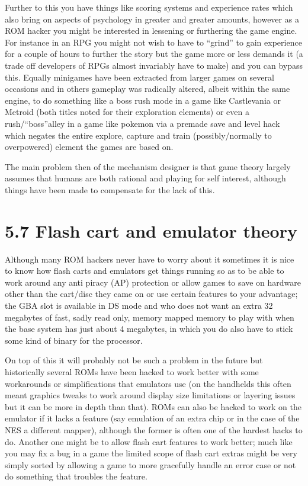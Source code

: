 \documentclass[
]{book}
\begin{document}
Further to this you have things like scoring systems and experience rates which also bring on aspects of psychology in greater and greater amounts, however as a ROM hacker you might be interested in lessening or furthering the game engine. For instance in an RPG you might not wish to have to ``grind'' to gain experience for a couple of hours to further the story but the game more or less demands it (a trade off developers of RPGs almost invariably have to make) and you can bypass this. Equally minigames have been extracted from larger games on several occasions and in others gameplay was radically altered, albeit within the same engine, to do something like a boss rush mode in a game like Castlevania or Metroid (both titles noted for their exploration elements) or even a rush/``boss''alley in a game like pokemon via a premade save and level hack which negates the entire explore, capture and train (possibly/normally to overpowered) element the games are based on.

The main problem then of the mechanism designer is that game theory largely assumes that humans are both rational and playing for self interest, although things have been made to compensate for the lack of this.

\hypertarget{flash-cart-and-emulator-theory}{%
\section{5.7 Flash cart and emulator theory}\label{flash-cart-and-emulator-theory}}

Although many ROM hackers never have to worry about it sometimes it is nice to know how flash carts and emulators get things running so as to be able to work around any anti piracy (AP) protection or allow games to save on hardware other than the cart/disc they came on or use certain features to your advantage; the GBA slot is available in DS mode and who does not want an extra 32 megabytes of fast, sadly read only, memory mapped memory to play with when the base system has just about 4 megabytes, in which you do also have to stick some kind of binary for the processor.

On top of this it will probably not be such a problem in the future but historically several ROMs have been hacked to work better with some workarounds or simplifications that emulators use (on the handhelds this often meant graphics tweaks to work around display size limitations or layering issues but it can be more in depth than that). ROMs can also be hacked to work on the emulator if it lacks a feature (say emulation of an extra chip or in the case of the NES a different mapper), although the former is often one of the hardest hacks to do. Another one might be to allow flash cart features to work better; much like you may fix a bug in a game the limited scope of flash cart extras might be very simply sorted by allowing a game to more gracefully handle an error case or not do something that troubles the feature.
\end{document}
